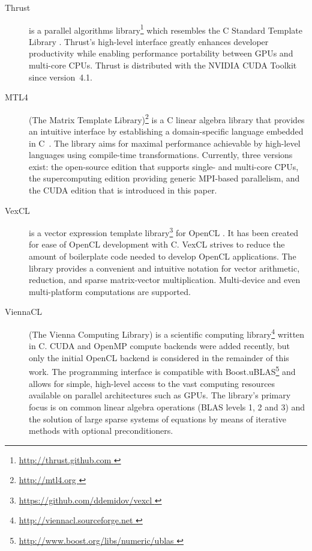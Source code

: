 \documentclass[final]{siamltex}
\newcommand{\addpp}[1]{{#1\nolinebreak[4]\hspace{-.05em}\raisebox{.4ex}{\tiny\bf ++}}\xspace}
\newcommand{\Cpp}{\addpp{C}}
\begin{document}
\begin{description}
    \item[Thrust] is a parallel algorithms library\footnote{ \href{
        http://thrust.github.com }{ http://thrust.github.com }} which resembles
        the \Cpp Standard Template Library \cite{ThrustRef}.  Thrust's
        high-level interface greatly enhances developer productivity while
        enabling performance portability between GPUs and multi-core CPUs.
        Thrust is distributed with the NVIDIA CUDA Toolkit since version~4.1.
    \item[MTL4] (The Matrix Template Library)\footnote{ \href{ http://mtl4.org }{
        http://mtl4.org }} is a \Cpp linear algebra library that provides
        an intuitive interface by establishing a domain-specific language
        embedded in \Cpp~\cite{pg_ccgrid12}.
        The library aims for maximal performance achievable by high-level languages
        using compile-time transformations.
        Currently, three versions exist: the open-source edition that supports
        single- and multi-core CPUs, the supercomputing edition providing
        generic MPI-based parallelism, and the CUDA edition that is introduced
        in this paper.
    \item[VexCL] is a vector expression template
        library\footnote{ \href{ https://github.com/ddemidov/vexcl }{
        https://github.com/ddemidov/vexcl }} for OpenCL \cite{VexCLRef}. It has
        been created for ease of OpenCL development with \Cpp.  VexCL strives to
        reduce the amount of boilerplate code needed to develop OpenCL
        applications. The library provides a convenient and intuitive notation
        for vector arithmetic, reduction, and sparse matrix-vector
        multiplication.  Multi-device and even multi-platform computations are
        supported.
    \item[ViennaCL] (The Vienna Computing Library) is a scientific computing
        library\footnote{ \href{ http://viennacl.sourceforge.net }{
        http://viennacl.sourceforge.net }} written in \Cpp \cite{ViennaCLRef}.
        CUDA and OpenMP compute backends were added recently, but
        only the initial OpenCL backend is considered in the remainder of this work.
        The programming interface is compatible with
        Boost.uBLAS\footnote{ \href{ http://www.boost.org/libs/numeric/ublas }
        { http://www.boost.org/libs/numeric/ublas } }
        and allows for simple, high-level access to the vast
        computing resources available on parallel architectures such as GPUs.
        The library's primary focus is on common linear algebra operations (BLAS
        levels 1, 2 and 3) and the solution of large sparse systems of equations by
        means of iterative methods with optional preconditioners.
\end{description}
\end{document}
